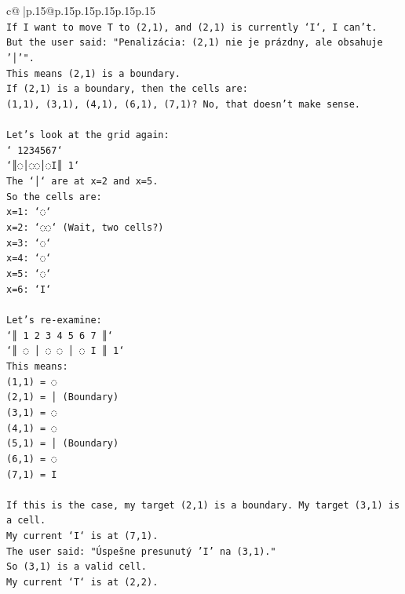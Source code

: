 \documentclass{article}
\begin{document}
{\begin{supertabular}{c@{$\;$}|p{.15\linewidth}@{}p{.15\linewidth}p{.15\linewidth}p{.15\linewidth}p{.15\linewidth}p{.15\linewidth}}
{{{\\ 
\texttt{If I want to move T to (2,1), and (2,1) is currently `I`, I can't.} \\
\texttt{But the user said: "Penalizácia: (2,1) nie je prázdny, ale obsahuje '│'".} \\
\texttt{This means (2,1) is a boundary.} \\
\texttt{If (2,1) is a boundary, then the cells are:} \\
\texttt{(1,1), (3,1), (4,1), (6,1), (7,1)? No, that doesn't make sense.} \\
\\ 
\texttt{Let's look at the grid again:} \\
\texttt{` 1234567`} \\
\texttt{`║◌│◌◌│◌I║ 1`} \\
\texttt{The `│` are at x=2 and x=5.} \\
\texttt{So the cells are:} \\
\texttt{x=1: `◌`} \\
\texttt{x=2: `◌◌` (Wait, two cells?)} \\
\texttt{x=3: `◌`} \\
\texttt{x=4: `◌`} \\
\texttt{x=5: `◌`} \\
\texttt{x=6: `I`} \\
\\ 
\texttt{Let's re{-}examine:} \\
\texttt{`║ 1 2 3 4 5 6 7 ║`} \\
\texttt{`║ ◌ │ ◌ ◌ │ ◌ I ║ 1`} \\
\texttt{This means:} \\
\texttt{(1,1) = ◌} \\
\texttt{(2,1) = │ (Boundary)} \\
\texttt{(3,1) = ◌} \\
\texttt{(4,1) = ◌} \\
\texttt{(5,1) = │ (Boundary)} \\
\texttt{(6,1) = ◌} \\
\texttt{(7,1) = I} \\
\\ 
\texttt{If this is the case, my target (2,1) is a boundary. My target (3,1) is a cell.} \\
\texttt{My current `I` is at (7,1).} \\
\texttt{The user said: "Úspešne presunutý 'I' na (3,1)."} \\
\texttt{So (3,1) is a valid cell.} \\
\texttt{My current `T` is at (2,2).} \\
}}}
\end{supertabular}}
\end{document}
